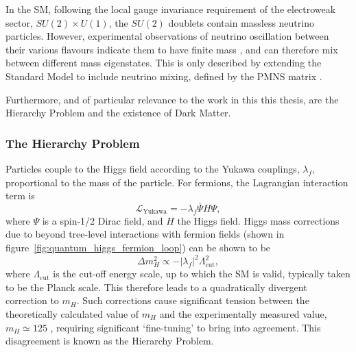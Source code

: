 In the SM, following the local gauge invariance requirement of the electroweak
sector, $SU(2)\times U(1)$, the $SU(2)$ doublets contain
massless neutrino particles. However, experimental observations of neutrino
oscillation between their various flavours indicate them to have finite mass
\cite{PhysRevLett.81.1562,PhysRevLett.89.011302}, and can
therefore mix between different mass eigenstates. This is only described
by extending the Standard Model to include neutrino mixing, defined by the
PMNS matrix \cite{Altarelli:2002hx}.

Furthermore, and of particular relevance to the work in this this thesis, are
the Hierarchy Problem and the existence of Dark Matter.

\subsubsection{The Hierarchy Problem}


Particles couple to the Higgs field according to the Yukawa couplings,
$\lambda_f$,
proportional to the mass of the particle. For fermions, the Lagrangian
interaction term is
% 
\begin{equation}
\mathcal{L}_\text{Yukawa} = - \lambda_f \bar{\Psi}H\Psi,
\end{equation}
% 
where $\Psi$ is a spin-1/2 Dirac field, and $H$ the Higgs field. Higgs mass
corrections due to beyond tree-level interactions with fermion
fields (shown in figure~\ref{fig:quantum_higgs_fermion_loop}) can be shown to be
% 
\begin{equation}
\Delta m_H^2 \propto -|\lambda_f|^2 \Lambda_{\text{cut}}^2,
\label{eq:higgs_corr_hierarchy}
\end{equation}
% 
where $\Lambda_{\text{cut}}$ is the cut-off energy scale, up to which the SM is
valid, typically taken to be the Planck scale. This therefore leads to a
quadratically
divergent correction to $m_H$. Such corrections cause significant tension
between the theoretically calculated value of $m_H$ and the experimentally
measured value, $m_H \simeq 125$ \gev \cite{PhysRevLett.114.191803},
requiring significant `fine-tuning' to bring into agreement. This disagreement
is known as the Hierarchy Problem.

